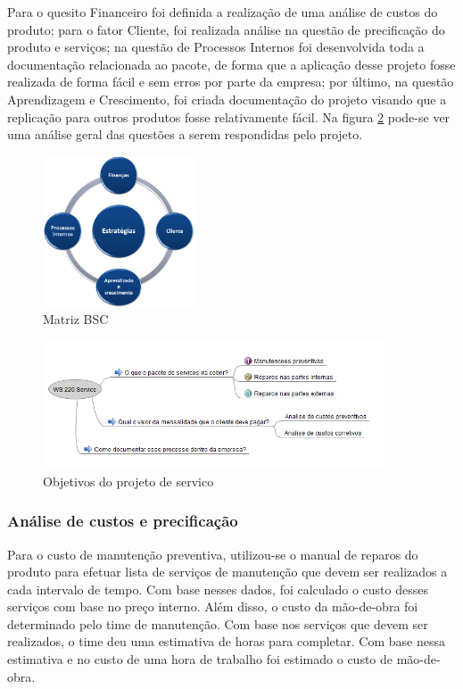 \documentclass[12pt]{article}
\begin{document}
	Para o quesito Financeiro foi definida a realização de uma análise de custos do produto; para o fator Cliente, foi realizada análise na questão de precificação do produto e serviços; na questão de Processos Internos foi desenvolvida toda a documentação relacionada ao pacote, de forma que a aplicação desse projeto fosse realizada de forma fácil e sem erros por parte da empresa; por último, na questão Aprendizagem e Crescimento, foi criada documentação do projeto visando que a replicação para outros produtos fosse relativamente fácil. Na figura \ref{fig:service} pode-se ver uma análise geral das questões a serem respondidas pelo projeto.

\begin{figure}[h!]
	\centering
	\includegraphics[width=0.4\textwidth]{img/bsc.png}
	\caption{Matriz BSC}
	\label{fig:bsc}
\end{figure}

\begin{figure}[h!]
	\centering
	\includegraphics[width=0.9\textwidth]{img/ws220.png}
	\caption{Objetivos do projeto de servico}
	\label{fig:service}
\end{figure}

\subsubsection{Análise de custos e precificação}

	Para o custo de manutenção preventiva, utilizou-se o manual de reparos do produto para efetuar lista de serviços de manutenção que devem ser realizados a cada intervalo de tempo. Com base nesses dados, foi calculado o custo desses serviços com base no preço interno. Além disso, o custo da mão-de-obra foi determinado pelo time de manutenção. Com base nos serviços que devem ser realizados, o time deu uma estimativa de horas para completar. Com base nessa estimativa e no custo de uma hora de trabalho foi estimado o custo de mão-de-obra.
\end{document}
